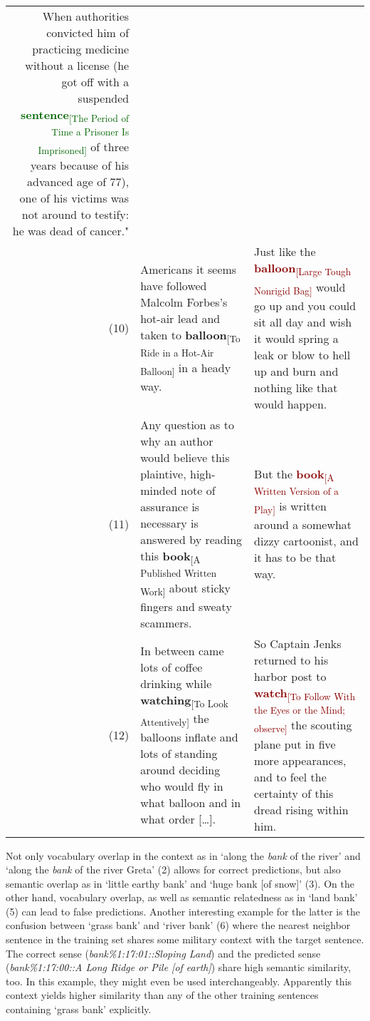 \documentclass[11pt]{article}
\begin{document}
\begin{table*}[]
{{\begin{tabular}{@{}rp{}p{}@{}}
When authorities convicted him of practicing medicine without a license (he got off with a suspended \textcolor{darkgreen}{\textbf{sentence}\textsubscript{[The Period of Time a Prisoner Is Imprisoned]}} of three years because of his advanced age of 77), one of his victims was not around to testify: he was dead of cancer." \\
(10) & Americans it seems have followed Malcolm Forbes's hot-air lead and taken to \textbf{balloon}\textsubscript{[To Ride in a Hot-Air Balloon]} in a heady way. &
Just like the \textcolor{darkred}{\textbf{balloon}\textsubscript{[Large Tough Nonrigid Bag]}} would go up and you could sit all day and wish it would spring a leak or blow to hell up and burn and nothing like that would happen. \vspace{0.15cm} \\
(11) & Any question as to why an author would believe this plaintive, high-minded note of assurance is necessary is answered by reading this \textbf{book}\textsubscript{[A Published Written Work]} about sticky fingers and sweaty scammers. \vspace{0.15cm} &
But the \textcolor{darkred}{\textbf{book}\textsubscript{[A Written Version of a Play]}} is written around a somewhat dizzy cartoonist, and it has to be that way. \\
(12) & In between came lots of coffee drinking while \textbf{watching}\textsubscript{[To Look Attentively]} the balloons inflate and lots of standing around deciding who would fly in what balloon and in what order [\dots]. &
So Captain Jenks returned to his harbor post to \textcolor{darkred}{\textbf{watch}\textsubscript{[To Follow With the Eyes or the Mind; observe]}} the scouting plane put in five more appearances, and to feel the certainty of this dread rising within him. \\ \bottomrule
\end{tabular}}}
\caption{Example predictions based on nearest neighbor sentences. The word in question is marked in boldface, subset with a short description of its WordNet synset (true positives \textcolor{darkgreen}{green}, false positives \textcolor{darkred}{red}).
}\label{tab:nn_sample}
\end{table*}


Not only vocabulary overlap in the context as in `along the \textit{bank} of the river' and `along the \textit{bank} of the river Greta' (2) allows for correct predictions, but also semantic overlap as in `little earthy bank' and `huge bank [of snow]' (3).
On the other hand, vocabulary overlap, as well as semantic relatedness as in `land bank' (5) can lead to false predictions. 
Another interesting example for the latter is the confusion between `grass bank' and `river bank' (6) where the nearest neighbor sentence in the training set shares some military context with the target sentence.
The correct sense (\emph{bank\%1:17:01::Sloping Land}) and the predicted sense (\emph{bank\%1:17:00::A Long Ridge or Pile [of earth]}) share high semantic similarity, too. In this example, they might even be used interchangeably.
Apparently this context yields higher similarity than any of the other training sentences containing `grass bank' explicitly.
\end{document}
